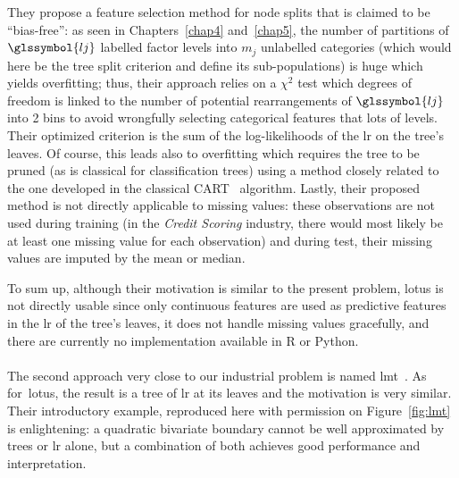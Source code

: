 They propose a feature selection method for node splits that is claimed to be ``bias-free'': as seen in Chapters~\ref{chap4} and~\ref{chap5}, the number of partitions of $\glssymbol{lj}$ labelled factor levels into $m_j$ unlabelled categories (which would here be the tree split criterion and define its sub-populations) is huge which yields overfitting; thus, their approach relies on a $\chi^2$ test which degrees of freedom is linked to the number of potential rearrangements of $\glssymbol{lj}$ into 2 bins to avoid wrongfully selecting categorical features that lots of levels. Their optimized criterion is the sum of the log-likelihoods of the \gls{lr} on the tree's leaves. Of course, this leads also to overfitting which requires the tree to be pruned (as is classical for classification trees) using a method closely related to the one developed in the classical CART~\cite{cart84} algorithm. Lastly, their proposed method is not directly applicable to missing values: these observations are not used during training (in the \textit{Credit Scoring} industry, there would most likely be at least one missing value for each observation) and during test, their missing values are imputed by the mean or median.

To sum up, although their motivation is similar to the present problem, \gls{lotus} is not directly usable since only continuous features are used as predictive features in the \gls{lr} of the tree's leaves, it does not handle missing values gracefully, and there are currently no implementation available in \textsf{R} or Python.

\paragraph{}

The second approach very close to our industrial problem is named \gls{lmt}~\cite{landwehr2005logistic}. As for~\gls{lotus}, the result is a tree of \gls{lr} at its leaves and the motivation is very similar. Their introductory example, reproduced here with permission on Figure~\ref{fig:lmt} is enlightening: a quadratic bivariate boundary cannot be well approximated by trees or \gls{lr} alone, but a combination of both achieves good performance and interpretation.

